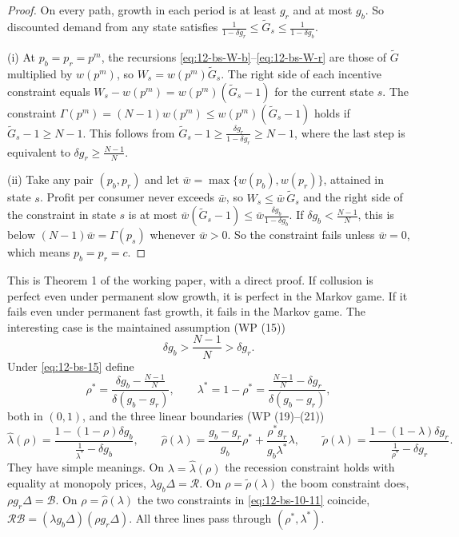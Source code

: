 \begin{proof}
On every path, growth in each period is at least $g_r$ and at most $g_b$. So discounted demand from any state satisfies
$\frac{1}{1 - \delta g_r} \le \tilde G_s \le \frac{1}{1 - \delta g_b}$.

(i) At $p_b = p_r = p^m$, the recursions \eqref{eq:12-bs-W-b}--\eqref{eq:12-bs-W-r} are those of $\tilde G$ multiplied by $w(p^m)$,
so $W_s = w(p^m)\tilde G_s$. The right side of each incentive constraint equals $W_s - w(p^m) = w(p^m)(\tilde G_s - 1)$ for
the current state $s$. The constraint $\Gamma(p^m) = (N-1)w(p^m) \le w(p^m)(\tilde G_s - 1)$ holds if $\tilde G_s - 1 \ge N - 1$.
This follows from $\tilde G_s - 1 \ge \frac{\delta g_r}{1 - \delta g_r} \ge N - 1$, where the last step is equivalent to
$\delta g_r \ge \frac{N-1}{N}$.

(ii) Take any pair $(p_b, p_r)$ and let $\bar w = \max\{w(p_b), w(p_r)\}$, attained in state $s$. Profit per consumer never
exceeds $\bar w$, so $W_s \le \bar w\,\tilde G_s$ and the right side of the constraint in state $s$ is at most
$\bar w(\tilde G_s - 1) \le \bar w\frac{\delta g_b}{1 - \delta g_b}$. If $\delta g_b < \frac{N-1}{N}$, this is below $(N-1)\bar w =
\Gamma(p_s)$ whenever $\bar w > 0$. So the constraint fails unless $\bar w = 0$, which means $p_b = p_r = c$.
\end{proof}

This is Theorem 1 of the working paper, with a direct proof. If collusion is perfect even under permanent slow
growth, it is perfect in the Markov game. If it fails even under permanent fast growth, it fails in the Markov game.
The interesting case is the maintained assumption (WP (15))
\begin{equation}\label{eq:12-bs-15}
\delta g_b > \frac{N-1}{N} > \delta g_r .
\end{equation}
Under \eqref{eq:12-bs-15} define
\begin{equation}\label{eq:12-bs-rho-star}
\rho^* = \frac{\delta g_b - \frac{N-1}{N}}{\delta(g_b - g_r)}, \qquad \lambda^* = 1 - \rho^* = \frac{\frac{N-1}{N} - \delta g_r}{\delta(g_b - g_r)},
\end{equation}
both in $(0,1)$, and the three linear boundaries (WP (19)--(21))
\begin{equation}\label{eq:12-bs-boundaries}
\hat\lambda(\rho) = \frac{1 - (1-\rho)\delta g_b}{\frac{1}{\lambda^*} - \delta g_b}, \qquad
\hat\rho(\lambda) = \frac{g_b - g_r}{g_b}\rho^* + \frac{\rho^* g_r}{g_b\lambda^*}\lambda, \qquad
\tilde\rho(\lambda) = \frac{1 - (1-\lambda)\delta g_r}{\frac{1}{\rho^*} - \delta g_r}.
\end{equation}
They have simple meanings. On $\lambda = \hat\lambda(\rho)$ the recession constraint holds with equality at monopoly prices,
$\lambda g_b\Delta = \mathcal R$. On $\rho = \tilde\rho(\lambda)$ the boom constraint does, $\rho g_r\Delta = \mathcal B$. On
$\rho = \hat\rho(\lambda)$ the two constraints in \eqref{eq:12-bs-10-11} coincide, $\mathcal{R}\mathcal{B} = (\lambda g_b\Delta)(\rho g_r\Delta)$.
All three lines pass through $(\rho^*, \lambda^*)$.

